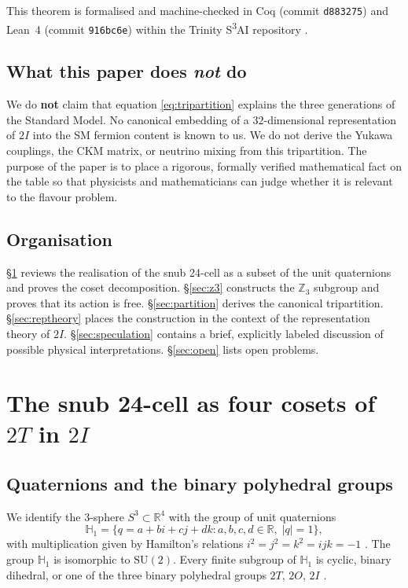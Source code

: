 \documentclass[10pt,reqno]{amsart}
\theoremstyle{plain}
\theoremstyle{definition}
\begin{document}
This theorem is formalised and machine-checked in Coq (commit \texttt{d883275}) and Lean~4 (commit \texttt{916bc6e}) within the Trinity S\textsuperscript{3}AI repository \cite{trinitys3ai}.

\subsection*{What this paper does \emph{not} do}

We do \textbf{not} claim that equation \eqref{eq:tripartition} explains the three generations of the Standard Model. No canonical embedding of a $32$-dimensional representation of $2I$ into the SM fermion content is known to us. We do not derive the Yukawa couplings, the CKM matrix, or neutrino mixing from this tripartition. The purpose of the paper is to place a rigorous, formally verified mathematical fact on the table so that physicists and mathematicians can judge whether it is relevant to the flavour problem.

\subsection*{Organisation}

\S\ref{sec:snub} reviews the realisation of the snub 24-cell as a subset of the unit quaternions and proves the coset decomposition. \S\ref{sec:z3} constructs the $\mathbb{Z}_3$ subgroup and proves that its action is free. \S\ref{sec:partition} derives the canonical tripartition. \S\ref{sec:reptheory} places the construction in the context of the representation theory of $2I$. \S\ref{sec:speculation} contains a brief, explicitly labeled discussion of possible physical interpretations. \S\ref{sec:open} lists open problems.

\section{The snub 24-cell as four cosets of $2T$ in $2I$}\label{sec:snub}

\subsection{Quaternions and the binary polyhedral groups}

We identify the $3$-sphere $S^3 \subset \mathbb{R}^4$ with the group of unit quaternions
\begin{equation}
\mathbb{H}_1 = \{ q = a + bi + cj + dk : a,b,c,d \in \mathbb{R},\; |q|=1 \},
\end{equation}
with multiplication given by Hamilton's relations $i^2=j^2=k^2=ijk=-1$ \cite{Hamilton1843}. The group $\mathbb{H}_1$ is isomorphic to $\mathrm{SU}(2)$. Every finite subgroup of $\mathbb{H}_1$ is cyclic, binary dihedral, or one of the three binary polyhedral groups $2T$, $2O$, $2I$ \cite{duVal1964,CS1999}.
\end{document}
